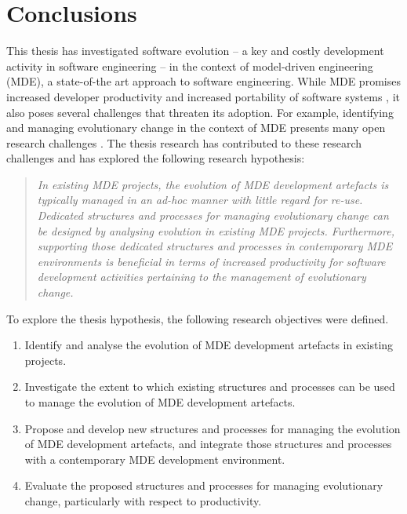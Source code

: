 
\chapter{Conclusions}
\label{Conclusion}

This thesis has investigated software evolution -- a key and costly development activity in software engineering \cite{moad90maintaining} -- in the context of model-driven engineering (MDE), a state-of-the art approach to software engineering. While MDE promises increased developer productivity \cite{watson08mdahistory} and increased portability of software systems \cite{frankel02mda}, it also poses several challenges that threaten its adoption. For \cc example, identifying and managing evolutionary change in the context of MDE presents many open research challenges \cite{Mens07}. The thesis research has contributed to these research challenges and has explored the following research hypothesis:

\begin{quote}
\emph{In existing MDE projects, the evolution of MDE development artefacts is typically managed in an ad-hoc manner with little regard for re-use. Dedicated structures and processes for managing evolutionary change can be designed by analysing evolution in existing MDE projects. Furthermore, supporting those dedicated structures and processes in contemporary MDE environments is beneficial in terms of increased productivity for software development activities pertaining to the management of evolutionary change.}
\end{quote} 

To explore the thesis hypothesis, the following research objectives were defined.

\begin{enumerate}
	\item Identify and analyse the evolution of MDE development artefacts in existing projects.
	\item Investigate the extent to which existing structures and processes can be used to manage the evolution of MDE development artefacts. 
	\item Propose and develop new structures and processes for managing the evolution of MDE development artefacts, and integrate those structures and processes with a contemporary MDE development environment.
	\item Evaluate the proposed structures and processes for managing evolutionary change, particularly with respect to productivity.
\end{enumerate}

